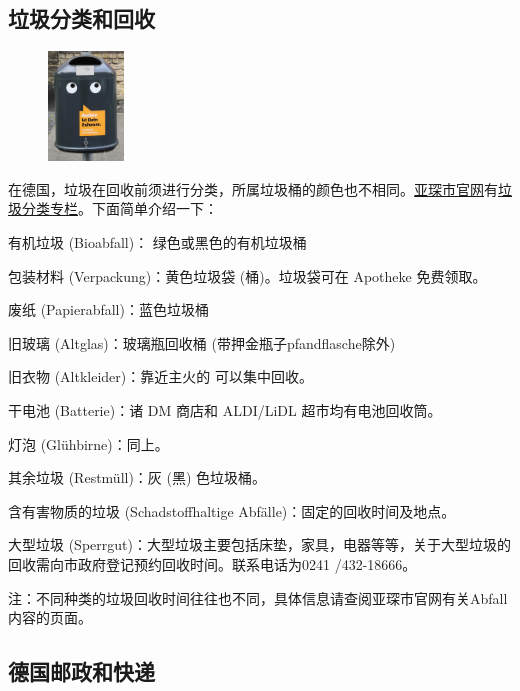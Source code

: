   \subsection{垃圾分类和回收}\label{subsec:垃圾分类和回收}

    \begin{figure}
      \begin{center}
        \includegraphics[width=0.18\textwidth]{在亚琛学习和生活/生活的一切琐碎问题/trash_bin.jpg}
      \end{center}
    \end{figure}

    在德国，垃圾在回收前须进行分类，所属垃圾桶的颜色也不相同。\href{http://www.aachen.de/CHIN/kurzinfo.html}{亚琛市官网}有\href{http://www.aachen.de/de/stadt_buerger/aachener_stadtbetrieb/leistungen/abfallwirtschaft/abfalltrennung/index.html}{垃圾分类专栏}。下面简单介绍一下：

    有机垃圾 (Bioabfall)： 绿色或黑色的有机垃圾桶

    包装材料 (Verpackung)：黄色垃圾袋 (桶)。垃圾袋可在 Apotheke 免费领取。

    废纸 (Papierabfall)：蓝色垃圾桶

    旧玻璃 (Altglas)：玻璃瓶回收桶 (带押金瓶子pfandflasche除外)

    旧衣物 (Altkleider)：靠近主火的  可以集中回收。

    干电池 (Batterie)：诸 DM 商店和 ALDI/LiDL 超市均有电池回收筒。

    灯泡 (Glühbirne)：同上。

    其余垃圾 (Restmüll)：灰 (黑) 色垃圾桶。

    含有害物质的垃圾 (Schadstoffhaltige Abfälle)：固定的回收时间及地点。

    大型垃圾 (Sperrgut)：大型垃圾主要包括床垫，家具，电器等等，关于大型垃圾的回收需向市政府登记预约回收时间。联系电话为0241 /432-18666。

    注：不同种类的垃圾回收时间往往也不同，具体信息请查阅亚琛市官网有关Abfall内容的页面。


  \subsection{德国邮政和快递}\label{subsec:德国邮政和快递}

